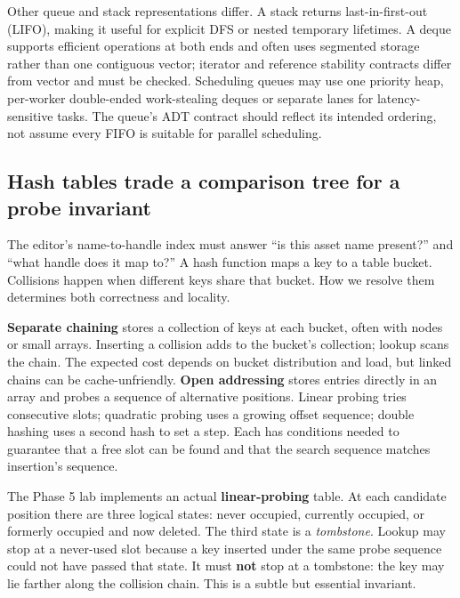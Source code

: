 Other queue and stack representations differ. A stack returns last-in-first-out (LIFO), making it useful for explicit DFS or nested temporary lifetimes. A deque supports efficient operations at both ends and often uses segmented storage rather than one contiguous vector; iterator and reference stability contracts differ from vector and must be checked. Scheduling queues may use one priority heap, per-worker double-ended work-stealing deques or separate lanes for latency-sensitive tasks. The queue's ADT contract should reflect its intended ordering, not assume every FIFO is suitable for parallel scheduling.

\subsection{Hash tables trade a comparison tree for a probe invariant}\label{01-foundations-i-ch007-hash-tables-trade-a-comparison-tree-for-a-probe-invariant}

The editor's name-to-handle index must answer ``is this asset name present?'' and ``what handle does it map to?'' A hash function maps a key to a table bucket. Collisions happen when different keys share that bucket. How we resolve them determines both correctness and locality.

\textbf{Separate chaining} stores a collection of keys at each bucket, often with nodes or small arrays. Inserting a collision adds to the bucket's collection; lookup scans the chain. The expected cost depends on bucket distribution and load, but linked chains can be cache-unfriendly. \textbf{Open addressing} stores entries directly in an array and probes a sequence of alternative positions. Linear probing tries consecutive slots; quadratic probing uses a growing offset sequence; double hashing uses a second hash to set a step. Each has conditions needed to guarantee that a free slot can be found and that the search sequence matches insertion's sequence.

The Phase 5 lab implements an actual \textbf{linear-probing} table. At each candidate position there are three logical states: never occupied, currently occupied, or formerly occupied and now deleted. The third state is a \emph{tombstone}. Lookup may stop at a never-used slot because a key inserted under the same probe sequence could not have passed that state. It must \textbf{not} stop at a tombstone: the key may lie farther along the collision chain. This is a subtle but essential invariant.

